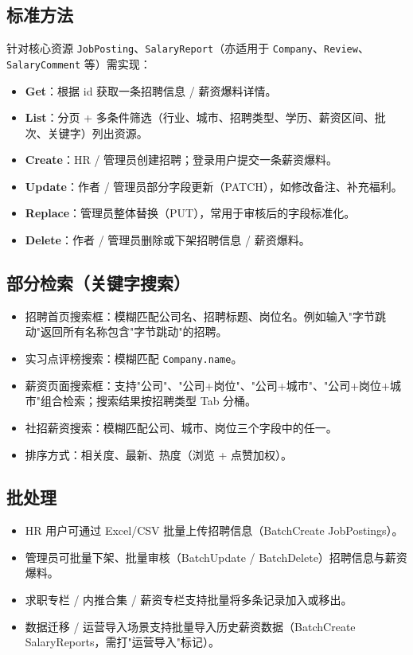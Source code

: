 \documentclass[12pt,a4paper]{ctexart}
\begin{document}
\subsection{标准方法}
针对核心资源 \texttt{JobPosting}、\texttt{SalaryReport}（亦适用于 \texttt{Company}、\texttt{Review}、\texttt{SalaryComment} 等）需实现：
\begin{itemize}[leftmargin=2em]
    \item \textbf{Get}：根据 id 获取一条招聘信息 / 薪资爆料详情。
    \item \textbf{List}：分页 + 多条件筛选（行业、城市、招聘类型、学历、薪资区间、批次、关键字）列出资源。
    \item \textbf{Create}：HR / 管理员创建招聘；登录用户提交一条薪资爆料。
    \item \textbf{Update}：作者 / 管理员部分字段更新（PATCH），如修改备注、补充福利。
    \item \textbf{Replace}：管理员整体替换（PUT），常用于审核后的字段标准化。
    \item \textbf{Delete}：作者 / 管理员删除或下架招聘信息 / 薪资爆料。
\end{itemize}

\subsection{部分检索（关键字搜索）}\label{sec:retrieval}
\begin{itemize}[leftmargin=2em]
    \item 招聘首页搜索框：模糊匹配公司名、招聘标题、岗位名。例如输入"字节跳动"返回所有名称包含"字节跳动"的招聘。
    \item 实习点评榜搜索：模糊匹配 \texttt{Company.name}。
    \item 薪资页面搜索框：支持"公司"、"公司+岗位"、"公司+城市"、"公司+岗位+城市"组合检索；搜索结果按招聘类型 Tab 分桶。
    \item 社招薪资搜索：模糊匹配公司、城市、岗位三个字段中的任一。
    \item 排序方式：相关度、最新、热度（浏览 + 点赞加权）。
\end{itemize}

\subsection{批处理}
\begin{itemize}[leftmargin=2em]
    \item HR 用户可通过 Excel/CSV 批量上传招聘信息（BatchCreate JobPostings）。
    \item 管理员可批量下架、批量审核（BatchUpdate / BatchDelete）招聘信息与薪资爆料。
    \item 求职专栏 / 内推合集 / 薪资专栏支持批量将多条记录加入或移出。
    \item 数据迁移 / 运营导入场景支持批量导入历史薪资数据（BatchCreate SalaryReports，需打"运营导入"标记）。
\end{itemize}
\end{document}
